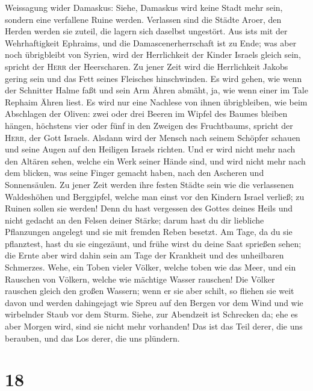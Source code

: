  Weissagung wider Damaskus: Siehe, Damaskus wird keine
Stadt mehr sein, sondern eine verfallene Ruine werden. 
Verlassen sind die Städte Aroer, den Herden werden sie zuteil, die
lagern sich daselbst ungestört.  Aus ist\textquotesingle s
mit der Wehrhaftigkeit Ephraims, und die Damascenerherrschaft ist zu
Ende; was aber noch übrigbleibt von Syrien, wird der Herrlichkeit der
Kinder Israels gleich sein, spricht der \textsc{Herr} der Heerscharen.
 Zu jener Zeit wird die Herrlichkeit Jakobs gering sein
und das Fett seines Fleisches hinschwinden.  Es wird
gehen, wie wenn der Schnitter Halme faßt und sein Arm Ähren abmäht, ja,
wie wenn einer im Tale Rephaim Ähren liest.  Es wird nur
eine Nachlese von ihnen übrigbleiben, wie beim Abschlagen der Oliven:
zwei oder drei Beeren im Wipfel des Baumes bleiben hängen, höchstens
vier oder fünf in den Zweigen des Fruchtbaums, spricht der
\textsc{Herr}, der Gott Israels.  Alsdann wird der Mensch
nach seinem Schöpfer schauen und seine Augen auf den Heiligen Israels
richten.  Und er wird nicht mehr nach den Altären sehen,
welche ein Werk seiner Hände sind, und wird nicht mehr nach dem blicken,
was seine Finger gemacht haben, nach den Ascheren und Sonnensäulen.
 Zu jener Zeit werden ihre festen Städte sein wie die
verlassenen Waldeshöhen und Berggipfel, welche man einst vor den Kindern
Israel verließ; zu Ruinen sollen sie werden!  Denn du
hast vergessen des Gottes deines Heils und nicht gedacht an den Felsen
deiner Stärke; darum hast du dir liebliche Pflanzungen angelegt und sie
mit fremden Reben besetzt.  Am Tage, da du sie
pflanztest, hast du sie eingezäunt, und frühe wirst du deine Saat
sprießen sehen; die Ernte aber wird dahin sein am Tage der Krankheit und
des unheilbaren Schmerzes.  Wehe, ein Toben vieler
Völker, welche toben wie das Meer, und ein Rauschen von Völkern, welche
wie mächtige Wasser rauschen!  Die Völker rauschen gleich
den großen Wassern; wenn er sie aber schilt, so fliehen sie weit davon
und werden dahingejagt wie Spreu auf den Bergen vor dem Wind und wie
wirbelnder Staub vor dem Sturm.  Siehe, zur Abendzeit ist
Schrecken da; ehe es aber Morgen wird, sind sie nicht mehr vorhanden!
Das ist das Teil derer, die uns berauben, und das Los derer, die uns
plündern.

\hypertarget{section-17}{%
\section{18}\label{section-17}}

